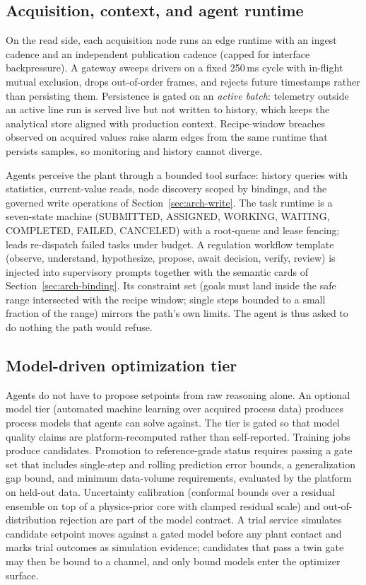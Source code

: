 \subsection{Acquisition, context, and agent runtime}
\label{sec:arch-daq}

On the read side, each acquisition node runs an edge runtime with an
ingest cadence and an independent publication cadence (capped for
interface backpressure). A gateway sweeps drivers on a fixed 250\,ms
cycle with in-flight mutual exclusion, drops out-of-order frames, and
rejects future timestamps rather than persisting them. Persistence is
gated on an \emph{active batch}: telemetry outside an active line run is
served live but not written to history, which keeps the analytical store
aligned with production context. Recipe-window breaches observed on
acquired values raise alarm edges from the same runtime that persists
samples, so monitoring and history cannot diverge.

Agents perceive the plant through a bounded tool surface: history queries
with statistics, current-value reads, node discovery scoped by bindings,
and the governed write operations of
Section~\ref{sec:arch-write}. The task runtime is a seven-state machine
(SUBMITTED, ASSIGNED, WORKING, WAITING, COMPLETED, FAILED, CANCELED) with a
root-queue and lease fencing; leads re-dispatch failed tasks under budget.
A regulation workflow template (observe, understand, hypothesize,
propose, await decision, verify, review) is injected into supervisory
prompts together with the semantic cards of Section~\ref{sec:arch-binding}.
Its constraint set (goals must land inside the safe range intersected
with the recipe window; single steps bounded to a small fraction of the
range) mirrors the path's own limits. The agent is thus asked to do
nothing the path would refuse.

\subsection{Model-driven optimization tier}
\label{sec:arch-opt}

Agents do not have to propose setpoints from raw reasoning alone. An
optional model tier (automated machine learning over acquired process
data) produces process models that agents can solve against. The tier is
gated so that model quality claims are platform-recomputed rather than
self-reported. Training jobs produce candidates. Promotion to
reference-grade status requires passing a gate set that includes
single-step and rolling prediction error bounds, a generalization gap
bound, and minimum data-volume requirements, evaluated by the platform on
held-out data. Uncertainty calibration (conformal bounds over a residual
ensemble on top of a physics-prior core with clamped residual scale) and
out-of-distribution rejection are part of the model contract. A trial
service simulates candidate setpoint moves against a gated model before
any plant contact and marks trial outcomes as simulation evidence;
candidates that pass a twin gate may then be bound to a channel, and only
bound models enter the optimizer surface.

